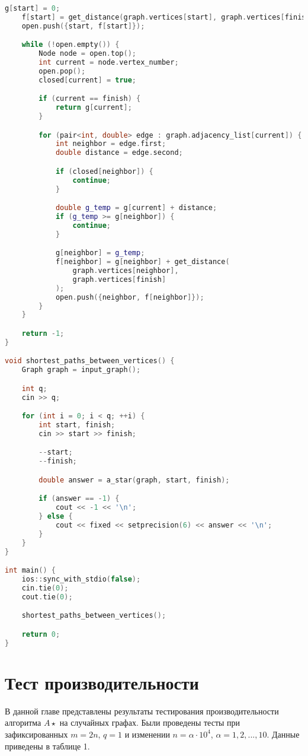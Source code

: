 \documentclass[12pt]{article}
\begin{document}
\begin{lstlisting}[language=C++, basicstyle=\ttfamily\footnotesize, breaklines=true]
    g[start] = 0;
    f[start] = get_distance(graph.vertices[start], graph.vertices[finish]);
    open.push({start, f[start]});

    while (!open.empty()) {
        Node node = open.top();
        int current = node.vertex_number;
        open.pop();
        closed[current] = true;

        if (current == finish) {
            return g[current];
        }

        for (pair<int, double> edge : graph.adjacency_list[current]) {
            int neighbor = edge.first;
            double distance = edge.second;

            if (closed[neighbor]) {
                continue;
            }

            double g_temp = g[current] + distance;
            if (g_temp >= g[neighbor]) {
                continue;
            }

            g[neighbor] = g_temp;
            f[neighbor] = g[neighbor] + get_distance(
                graph.vertices[neighbor],
                graph.vertices[finish]
            );
            open.push({neighbor, f[neighbor]});
        }
    }

    return -1;
}

void shortest_paths_between_vertices() {
    Graph graph = input_graph();

    int q;
    cin >> q;

    for (int i = 0; i < q; ++i) {
        int start, finish;
        cin >> start >> finish;

        --start;
        --finish;

        double answer = a_star(graph, start, finish);

        if (answer == -1) {
            cout << -1 << '\n';
        } else {
            cout << fixed << setprecision(6) << answer << '\n';
        }
    }
}

int main() {
    ios::sync_with_stdio(false);
    cin.tie(0);
    cout.tie(0);

    shortest_paths_between_vertices();

    return 0;
}
\end{lstlisting}

\newpage
\section*{Тест производительности}
В данной главе представлены результаты тестирования производительности алгоритма $A\star$ на случайных графах. Были проведены тесты при зафиксированных $m = 2n$, $q = 1$ и изменении $n = \alpha \cdot 10^4$, $\alpha = 1, 2, ..., 10$. Данные приведены в таблице 1.
\end{document}
